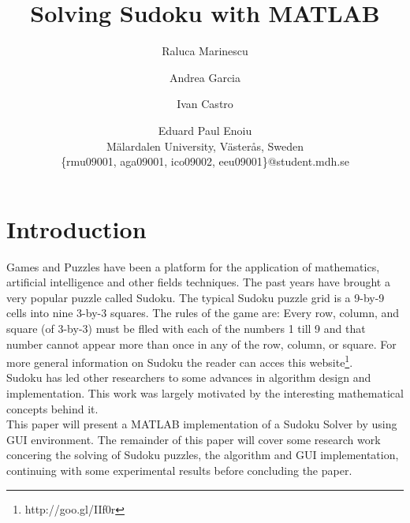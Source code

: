 \documentclass[12pt,a4paper]{article} %
\title{\bf{Solving Sudoku with MATLAB}} %
\author{Raluca Marinescu \and Andrea Garcia \and Ivan Castro \and Eduard Paul Enoiu \\
  Mälardalen University, Västerås, Sweden\\
  \textsf{\{rmu09001, aga09001,  ico09002, eeu09001\}@student.mdh.se}}
\begin{document}
\maketitle %
\begin{abstract}
\end{abstract}
\newpage
\tableofcontents
\newpage
\section{Introduction}
Games and Puzzles have been a platform for the application of mathematics, artificial intelligence and other fields techniques. The past years have brought a very popular puzzle called Sudoku. The typical Sudoku puzzle grid is a 9-by-9 cells into nine 3-by-3 squares. The rules of the game are: Every row, column, and square (of 3-by-3) must be flled with each of the numbers 1 till 9 and that number cannot appear more than once in any of the row, column, or square. For more general information on Sudoku the reader can acces this website\footnote{http://goo.gl/IIf0r}.
\newline
\\Sudoku has led other researchers to some advances in algorithm design and implementation. This work was largely motivated by the interesting mathematical concepts behind it.
\newline
\\ This paper will present a MATLAB implementation of a Sudoku Solver by using GUI environment. The remainder of this paper will cover some research work concering the solving of Sudoku puzzles, the algorithm and GUI implementation, continuing with some experimental results before concluding the paper.
\end{document}
